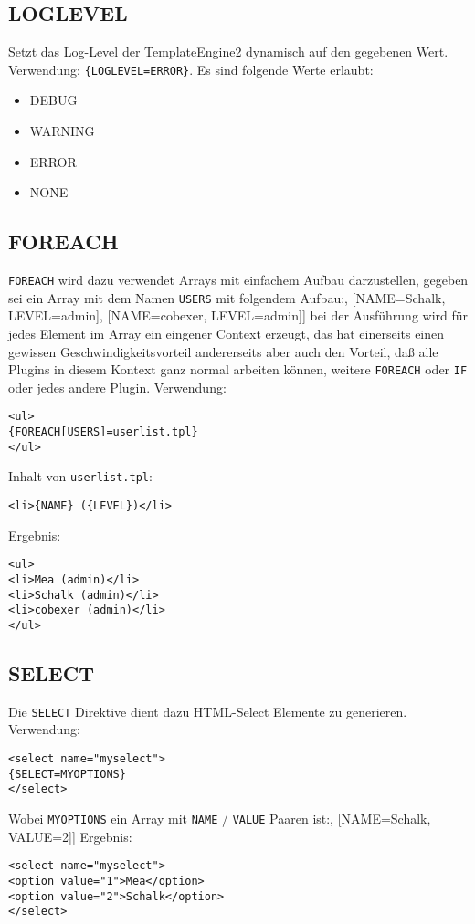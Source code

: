 \documentclass[a4paper,10pt]{article}
\begin{document}
\subsection{LOGLEVEL}
Setzt das Log-Level der TemplateEngine2 dynamisch auf den gegebenen Wert. Verwendung: {\tt \{LOGLEVEL=ERROR\}}.
Es sind folgende Werte erlaubt:
\begin{itemize}
 \item DEBUG
 \item WARNING
 \item ERROR
 \item NONE
\end{itemize}

\subsection{FOREACH}
{\tt FOREACH} wird dazu verwendet Arrays mit einfachem Aufbau darzustellen,
gegeben sei ein Array mit dem Namen {\tt USERS} mit folgendem Aufbau:\newline
[[NAME=Mea, LEVEL=admin], [NAME=Schalk, LEVEL=admin], [NAME=cobexer, LEVEL=admin]]\newline
bei der Ausf\"uhrung wird f\"ur jedes Element im Array ein eingener Context erzeugt, das hat einerseits
einen gewissen Geschwindigkeitsvorteil andererseits aber auch den Vorteil, da\ss{} alle Plugins in diesem
Kontext ganz normal arbeiten k\"onnen, weitere {\tt FOREACH} oder {\tt IF} oder jedes andere Plugin.\newline
Verwendung:
\lstset{language=HTML}
\begin{lstlisting}
<ul>
{FOREACH[USERS]=userlist.tpl}
</ul>
\end{lstlisting}
Inhalt von \texttt{userlist.tpl}:
\begin{lstlisting}
<li>{NAME} ({LEVEL})</li>
\end{lstlisting}
Ergebnis:
\begin{lstlisting}
<ul>
<li>Mea (admin)</li>
<li>Schalk (admin)</li>
<li>cobexer (admin)</li>
</ul>
\end{lstlisting}


\subsection{SELECT}
Die {\tt SELECT} Direktive dient dazu HTML-Select Elemente zu generieren. Verwendung:\newline
\begin{lstlisting}
<select name="myselect">
{SELECT=MYOPTIONS}
</select>
\end{lstlisting}
Wobei {\tt MYOPTIONS} ein Array mit {\tt NAME} / {\tt VALUE} Paaren ist:\newline
[[NAME=Mea, VALUE=1], [NAME=Schalk, VALUE=2]]\newline
Ergebnis:
\begin{lstlisting}
<select name="myselect">
<option value="1">Mea</option>
<option value="2">Schalk</option>
</select>
\end{lstlisting}
\end{document}
